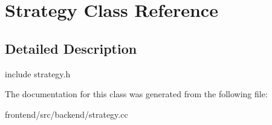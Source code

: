 \hypertarget{classStrategy}{\section{Strategy Class Reference}
\label{classStrategy}
}


\subsection{Detailed Description}
include strategy.\-h 

The documentation for this class was generated from the following file\-:\begin{DoxyCompactItemize}
\item 
frontend/src/backend/strategy.\-cc\end{DoxyCompactItemize}
